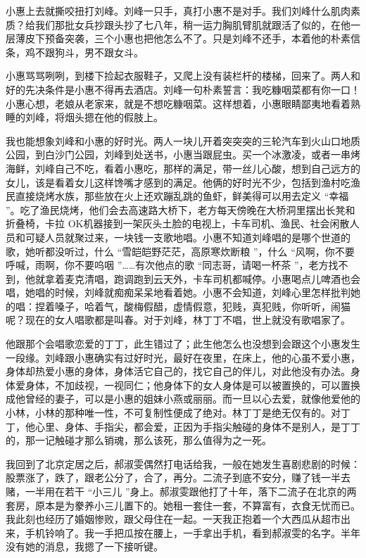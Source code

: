 \documentclass[12pt,twoside,openany]{book}
\begin{document}
小惠上去就撕咬扭打刘峰。刘峰一只手，真打小惠不是对手。我们刘峰什么肌肉素质？给我们那批女兵抄跟头抄了七八年，稍一运力胸肌臂肌就跟活了似的，在他一层薄皮下预备突袭，三个小惠也把他怎么不了。只是刘峰不还手，本着他的朴素信条，鸡不跟狗斗，男不跟女斗。

小惠骂骂咧咧，到楼下捡起衣服鞋子，又爬上没有装栏杆的楼梯，回来了。两人和好的先决条件是小惠不得再去酒店。刘峰一句朴素誓言：我吃糠咽菜都有你一口！小惠心想，老娘从老家来，就是不想吃糠咽菜。这样想着，小惠眼睛鄙夷地看着熟睡的刘峰，将烟头摁在他的假肢上。

我也能想象刘峰和小惠的好时光。两人一块儿开着突突突的三轮汽车到火山口地质公园，到白沙门公园，刘峰到处送书，小惠当跟屁虫。买一个冰激凌，或者一串烤海鲜，刘峰自己不吃，看着小惠吃，那样的满足，带一丝儿心酸，想到自己远方的女儿，该是看着女儿这样馋嘴才感到的满足。他俩的好时光不少，包括到渔村吃渔民直接烧烤水族，那些放在火上还欢蹦乱跳的鱼虾，鲜美得可以用去定义 “幸福 ”。吃了渔民烧烤，他们会去高速路大桥下，老方每天傍晚在大桥洞里摆出长凳和折叠椅，卡拉 OK机器接到一架灰头土脸的电视上，卡车司机、渔民、社会闲散人员和可疑人员就聚过来，一块钱一支歌地唱。小惠不知道刘峰唱的是哪个世道的歌，她听都没听过，什么 “雪皑皑野茫茫，高原寒炊断粮 ”，什么 “风啊，你不要呼喊，雨啊，你不要呜咽 ”……有次他点的歌 “同志哥，请喝一杯茶 ”，老方找不到，他就拿着麦克清唱，跑调跑到云天外，卡车司机都喊停。小惠喝点儿啤酒也会唱，她唱的时候，刘峰就痴痴呆呆地看着她。小惠不会知道，刘峰心里怎样批判她的唱：捏着嗓子，哈着气，酸梅假醋，虚情假意，犯贱，真犯贱，你听听，闹猫呢？现在的女人唱歌都是叫春。对于刘峰，林丁丁不唱，世上就没有歌唱家了。

他跟那个会唱歌恋爱的丁丁，此生错过了；此生他怎么也没想到会跟这个小惠发生一段缘。刘峰跟小惠确实有过好时光，最好在夜里，在床上，他的心虽不爱小惠，身体却热爱小惠的身体，身体活它自己的，找它自己的伴儿，对此他没有办法。身体爱身体，不加歧视，一视同仁；他身体下的女人身体是可以被置换的，可以置换成他曾经的妻子，可以是小惠的姐妹小燕或丽丽。而一旦以心去爱，就像他爱他的小林，小林的那种唯一性，不可复制性便成了绝对。林丁丁是绝无仅有的。对丁丁，他心里、身体、手指尖，都会爱，正因为手指尖触碰的身体不是别人，是丁丁的，那一记触碰才那么销魂，那么该死，那么值得为之一死。

我回到了北京定居之后，郝淑雯偶然打电话给我，一般在她发生喜剧悲剧的时候：股票涨了，跌了，跟老公分了，合了，再分。二流子到底不安分，赚了钱一半去赌，一半用在若干 “小三儿 ”身上。郝淑雯跟他打了十年，落下二流子在北京的两套房，原本是为豢养小三儿置下的。她租一套住一套，不算富有，衣食无忧而已。我此刻也经历了婚姻惨败，跟父母住在一起。一天我正抱着一个大西瓜从超市出来，手机铃响了。我一手把瓜按在腰上，一手拿出手机，看到郝淑雯的名字。半年没有她的消息，我摁了一下接听键。
\end{document}
